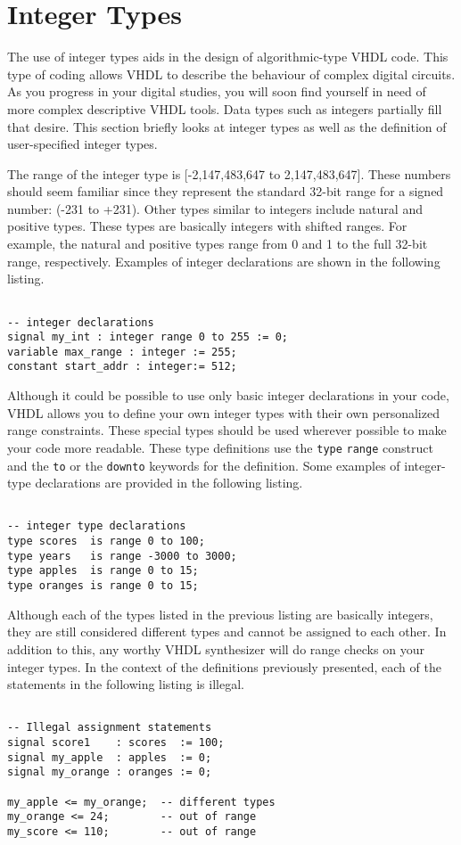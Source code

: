 \section{Integer Types}
The use of integer types aids in the design of algorithmic-type VHDL code. This type of coding allows VHDL to describe the behaviour of complex digital circuits. As you progress in your digital studies, you will soon find yourself in need of more complex descriptive VHDL tools. Data types such as integers partially fill that desire. This section briefly looks at integer types as well as the definition of user-specified integer types.

The range of the integer type is [-2,147,483,647 to 2,147,483,647]. These numbers should seem familiar since they represent the standard 32-bit range for a signed number: (-231 to +231). Other types similar to integers include natural and positive types. These types are basically integers with shifted ranges. For example, the natural and positive types range from 0 and 1 to the full 32-bit range, respectively. Examples of integer declarations are shown in the following listing.
\vspace{8pt}
\begin{lstlisting}

-- integer declarations
signal my_int : integer range 0 to 255 := 0;
variable max_range : integer := 255;
constant start_addr : integer:= 512;
\end{lstlisting}

Although it could be possible to use only basic integer declarations in your code, VHDL allows you to define your own integer types with their own personalized range constraints. These special types should be used wherever possible to make your code more readable. These type definitions use the \texttt{type} \texttt{range} construct and the \texttt{to} or the \texttt{downto} keywords for the definition. Some examples of integer-type declarations are provided in the following listing.
\vspace{8pt}
\begin{lstlisting}

-- integer type declarations
type scores  is range 0 to 100; 
type years   is range -3000 to 3000; 
type apples  is range 0 to 15; 
type oranges is range 0 to 15; 
\end{lstlisting}

Although each of the types listed in the previous listing are basically integers, they are still considered different types and cannot be assigned to each other. In addition to this, any worthy VHDL synthesizer will do range checks on your integer types. In the context of the definitions previously presented, each of the statements in the following listing is illegal. 
\vspace{8pt}
\begin{lstlisting}

-- Illegal assignment statements
signal score1    : scores  := 100;  
signal my_apple  : apples  := 0; 
signal my_orange : oranges := 0; 

my_apple <= my_orange;  -- different types
my_orange <= 24;        -- out of range
my_score <= 110;        -- out of range
\end{lstlisting}

